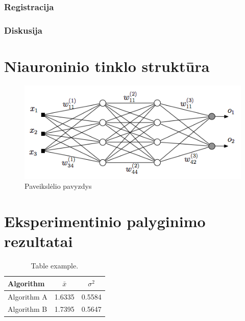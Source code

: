 \documentclass[12pt, a4paper, lithuanian]{article}
\begin{document}
\subsubsection{Registracija}
\subsubsection{Diskusija}




\appendix

\section{Niauroninio tinklo struktūra}
\begin{figure}[H]
    \centering
    \includegraphics[scale=0.5]{img/MLP}
    \caption{Paveikslėlio pavyzdys}
    \label{img:mlp}
\end{figure}


\section{Eksperimentinio palyginimo rezultatai}
\begin{table}[H]
  \centering
  \caption{Table example.}
  {\begin{tabular}{|l|c|c|} \hline
    Algorithm    & $\bar{x}$ & $\sigma^{2}$ \\
    \hline
    Algorithm A  & 1.6335    & 0.5584       \\
    Algorithm B  & 1.7395    & 0.5647       \\
    \hline
  \end{tabular}}
  \label{tab:table example}
\end{table}
\end{document}
